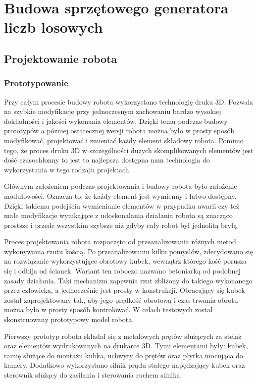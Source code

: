 
\chapter{Budowa sprzętowego generatora liczb losowych}
\section{Projektowanie robota}
\subsection{Prototypowanie}

Przy całym procesie budowy robota wykorzystano technologię druku 3D. Pozwala na szybkie modyfikacje przy 
jednoczesnym zachowaniu bardzo wysokiej dokładności i jakości wykonania elementów. Dzięki temu podczas budowy prototypów a 
pózniej ostatecznej wersji robota można było w prosty sposób modyfikować, projektować i zmieniać każdy element składowy 
robota. Pomimo tego, że proces druku 3D w szczególności dużych skomplikowanych elementów jest dość czasochłonny to jest to
najlepsza dostępna nam technologia do wykorzystania w tego rodzaju projektach.

Głównym założeniem podczas projektowania i budowy robota było założenie modułowości. Oznacza to, że każdy element jest wymienny i łatwo dostępny.
Dzięki takiemu podejściu wymienianie elementów w przypadku awarii czy też małe modyfikacje wynikające z udoskonalania działania robota
są znacząco prostsze i przede wszystkim szybsze niż gdyby cały robot był jednolitą bryłą.

Proces projektowania robota rozpoczęto od przeanalizowania różnych metod wykonywania rzutu kością.
Po przeanalizowaniu kilku pomysłów, zdecydowano się na rozwiązanie wykorzystujące obrotowy 
kubek, wewnątrz którego kość porusza się i odbija od ścianek. Wariant ten roboczo nazwano betoniarką od podobnej 
zasady działania. Taki mechanizm zapewnia rzut zbliżony do takiego wykonanego przez człowieka, a 
jednocześnie jest prosty w konstrukcji. Obracający się kubek został 
zaprojektowany tak, aby jego prędkość obrotową i czas trwania obrotu można było w prosty sposób kontrolować.
W celach testowych został skonstruowany prototypowy model robota.

Pierwszy prototyp robota składał się z metalowych prętów służących za stelaż oraz elementów wydrukowanych na drukarce 3D.
Tymi elementami były: kubek, ramię służące do montażu kubka, uchwyty do prętów oraz płytka mocująca do kamery. Dodatkowo
wykorzystano silnik prądu stałego napędzający kubek oraz sterownik służący do zasilania i sterowania ruchem silnika.

